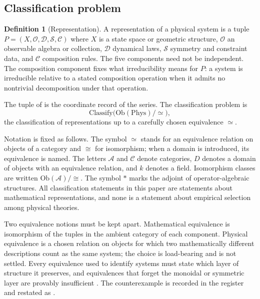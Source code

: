 \documentclass[11pt,letterpaper]{article}
\theoremstyle{definition}
\newtheorem{definition}[theorem]{Definition}
\theoremstyle{remark}
\begin{document}
\subsection{Classification problem}

\begin{definition}[Representation]
\label{def:tuple}
A representation of a physical system is a tuple $P = (X, \mathcal{O}, \mathcal{D}, \mathcal{S}, \mathcal{C})$ where $X$ is a state space or geometric structure, $\mathcal{O}$ an observable algebra or collection, $\mathcal{D}$ dynamical laws, $\mathcal{S}$ symmetry and constraint data, and $\mathcal{C}$ composition rules. The five components need not be independent. The composition component fixes what irreducibility means for $P$: a system is irreducible relative to a stated composition operation when it admits no nontrivial decomposition under that operation.
\end{definition}

The tuple of  is the coordinate record of the series. The classification problem is
\[
\mathrm{Classify}\bigl(\mathrm{Ob}(\mathrm{Phys})/{\simeq}\bigr),
\]
the classification of representations up to a carefully chosen equivalence $\simeq$.

Notation is fixed as follows. The symbol $\simeq$ stands for an equivalence relation on objects of a category and $\cong$ for isomorphism; when a domain is introduced, its equivalence is named. The letters $\mathcal{A}$ and $\mathcal{C}$ denote categories, $D$ denotes a domain of objects with an equivalence relation, and $k$ denotes a field. Isomorphism classes are written $\mathrm{Ob}(\mathcal{A})/{\cong}$. The symbol $*$ marks the adjoint of operator-algebraic structures. All classification statements in this paper are statements about mathematical representations, and none is a statement about empirical selection among physical theories.

Two equivalence notions must be kept apart. Mathematical equivalence is isomorphism of the tuples in the ambient category of each component. Physical equivalence is a chosen relation on objects for which two mathematically different descriptions count as the same system; the choice is load-bearing and is not settled. Every equivalence used to identify systems must state which layer of structure it preserves, and equivalences that forget the monoidal or symmetric layer are provably insufficient \cite{eg2000}. The counterexample is recorded in the register and restated as .
\end{document}
